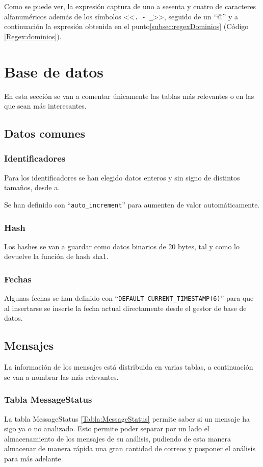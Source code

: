 Como se puede ver, la expresión captura de uno a sesenta y cuatro de caracteres alfanuméricos además de los símbolos <<\verb!. - _!>>, seguido de un “@” y a continuación la expresión obtenida en el punto\ref{subsec:regexDominios} (Código \ref{Regex:dominios}).

\section{Base de datos}
En esta sección se van a comentar únicamente las tablas más relevantes o en las que sean más interesantes. 
\subsection{Datos comunes}
\subsubsection{Identificadores}
Para los identificadores se han elegido datos enteros y sin signo de distintos tamaños, desde a.

Se han definido con “\verb!auto_increment!” para aumenten de valor automáticamente. 

\subsubsection{Hash}
Los hashes se van a guardar como datos binarios de 20 bytes, tal y como lo devuelve la función de hash sha1. 

\subsubsection{Fechas}
Algunas fechas se han definido con “\verb!DEFAULT CURRENT_TIMESTAMP(6)!” para que al insertarse se inserte la fecha actual directamente desde el gestor de base de datos. 

\subsection{Mensajes}
La información de los mensajes está distribuida en varias tablas, a continuación se van a nombrar las más relevantes. 

\subsubsection{Tabla MessageStatus}\label{Tabla_MessageStatus}
La tabla MessageStatus \ref{Tabla:MessageStatus} permite saber si un mensaje ha sigo ya o no analizado. Esto permite poder separar por un lado el almacenamiento de los mensajes de su análisis, pudiendo de esta manera almacenar de manera rápida una gran cantidad de correos y posponer el análisis para más adelante. 

